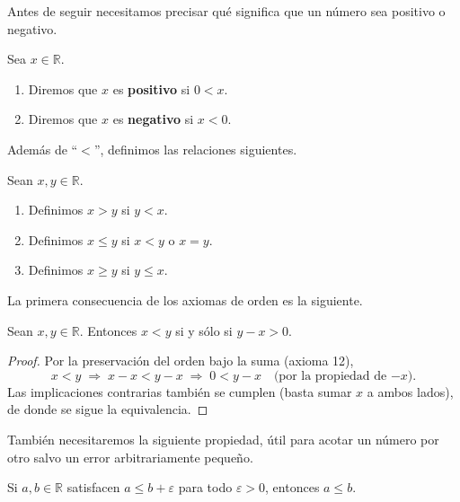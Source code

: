 \documentclass[12pt,a4paper]{book}
\begin{document}
  Antes de seguir necesitamos precisar qué significa que un número sea positivo o negativo.
  
  \begin{definicion}
    Sea $x \in \mathbb{R}$.
    \begin{enumerate}[label=(\alph*)]
      \item Diremos que $x$ es \textbf{positivo} si $0<x$.
      \item Diremos que $x$ es \textbf{negativo} si $x<0$.
    \end{enumerate}
  \end{definicion}
  
  Además de ``$<$'', definimos las relaciones siguientes.
  
  \begin{definicion}
    Sean $x,y \in \mathbb{R}$.
    \begin{enumerate}[label=(\alph*)]
      \item Definimos $x>y$ si $y<x$.
      \item Definimos $x \leq y$ si $x<y$ o $x=y$.
      \item Definimos $x \geq y$ si $y \leq x$.
    \end{enumerate}
  \end{definicion}
  
  La primera consecuencia de los axiomas de orden es la siguiente.
  
  \begin{proposicion}
    Sean $x,y \in \mathbb{R}$. Entonces $x<y$ si y sólo si $y-x>0$.
  \end{proposicion}
  
  \begin{proof}
    Por la preservación del orden bajo la suma (axioma 12),
    \begin{equation*}
      x<y \;\Rightarrow\; x-x < y-x \;\Rightarrow\; 0<y-x \quad \text{(por la propiedad de $-x$).}
    \end{equation*}
    Las implicaciones contrarias también se cumplen (basta sumar $x$ a ambos lados), de donde se sigue la equivalencia.
  \end{proof}
  
  También necesitaremos la siguiente propiedad, útil para acotar un número por otro salvo un error arbitrariamente pequeño.
  
  \begin{proposicion}
    Si $a,b \in \mathbb{R}$ satisfacen $a \leq b+\varepsilon$ para todo $\varepsilon>0$, entonces $a \leq b$.
  \end{proposicion}
  
\end{document}
